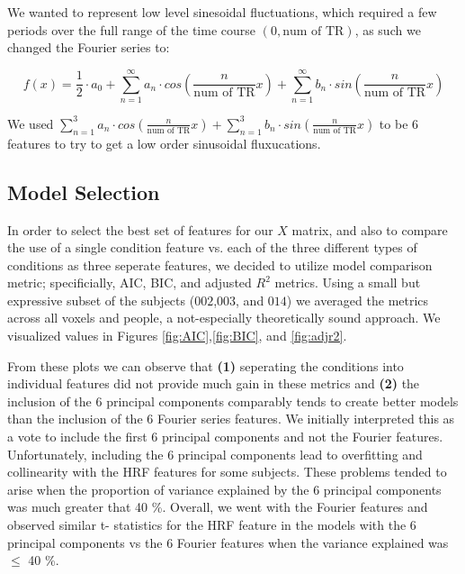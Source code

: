 \noindent We wanted to represent low level sinesoidal fluctuations, which required a 
few periods over the full range of the time course $(0, \text{num of TR})$, as such 
we changed the Fourier series to:

\begin{equation}
f(x) = \frac{1}{2} \cdot a_0 + \sum_{n=1}^{\infty} a_n \cdot cos(\frac{n}{\text{num of TR}} x) + \sum_{n=1}^{\infty} b_n \cdot sin(\frac{n}{\text{num of TR}} x)
\end{equation}

\noindent We used $ \sum_{n=1}^{3} a_n \cdot cos(\frac{n}{\text{num of TR}} x) + 
\sum_{n=1}^{3} b_n \cdot sin(\frac{n}{\text{num of TR}} x)$ to be 6 features to try 
to get a low order sinusoidal fluxucations.

\subsection{Model Selection} \label{model_selection}

\par In order to select the best set of features for our $X$ matrix, and also to 
compare the use of a single condition feature vs. each of the three different 
types of conditions as three seperate features, we decided to utilize model 
comparison metric; specificially, AIC, BIC, and adjusted $R^2$ metrics. Using a small but  
expressive subset of the subjects ($002$,$003$, and $014$) we averaged the metrics across all voxels and people, a not-especially theoretically sound approach. We visualized values in Figures \ref{fig:AIC},\ref{fig:BIC}, and \ref{fig:adjr2}. 

\par From these plots we can observe that \textbf{(1)} seperating the conditions into
individual features did not provide much gain in these metrics and \textbf{(2)}
the inclusion of the 6 principal components comparably tends to create better models than the 
inclusion of the 6 Fourier series features. We initially interpreted 
this as a vote to include the first 6 principal components and not the Fourier 
features. Unfortunately, including the 6 principal components lead to 
overfitting and collinearity with the HRF features for some subjects. These problems tended to arise
when the proportion of variance explained by the 6 principal components was much greater that 40 \%.
Overall, we went with the Fourier features and observed similar t-
statistics for the HRF feature in the models with the 6 principal components vs
the 6 Fourier features when the variance explained was $\leq$ 40 \%.


